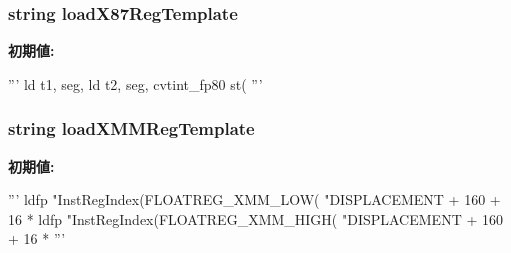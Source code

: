 \label{namespaceinsts_1_1simd128_1_1integer_1_1save__and__restore__state_1_1save__and__restore__state_a4c336f75776a67ec7e56c09e918c4f21}
\hypertarget{namespaceinsts_1_1simd128_1_1integer_1_1save__and__restore__state_1_1save__and__restore__state_a5a6854c32ce1e83c503679679b8e2242}{
\subsubsection[{loadX87RegTemplate}]{\setlength{\rightskip}{0pt plus 5cm}string {\bf loadX87RegTemplate}}}
\label{namespaceinsts_1_1simd128_1_1integer_1_1save__and__restore__state_1_1save__and__restore__state_a5a6854c32ce1e83c503679679b8e2242}
{\bfseries 初期値:}
\begin{DoxyCode}
'''
    ld t1, seg, %
    ld t2, seg, %
    cvtint_fp80 st(%
'''
\end{DoxyCode}
\hypertarget{namespaceinsts_1_1simd128_1_1integer_1_1save__and__restore__state_1_1save__and__restore__state_ae9677895981b19668ad03f0338499048}{
\subsubsection[{loadXMMRegTemplate}]{\setlength{\rightskip}{0pt plus 5cm}string {\bf loadXMMRegTemplate}}}
\label{namespaceinsts_1_1simd128_1_1integer_1_1save__and__restore__state_1_1save__and__restore__state_ae9677895981b19668ad03f0338499048}
{\bfseries 初期値:}
\begin{DoxyCode}
'''
    ldfp "InstRegIndex(FLOATREG_XMM_LOW(%
         "DISPLACEMENT + 160 + 16 * %
    ldfp "InstRegIndex(FLOATREG_XMM_HIGH(%
         "DISPLACEMENT + 160 + 16 * %
'''
\end{DoxyCode}
